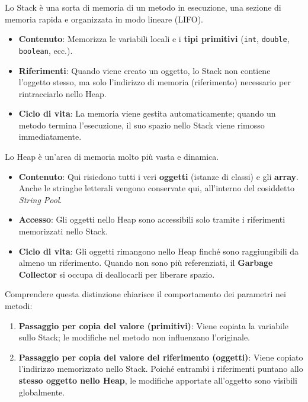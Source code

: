 Lo Stack è una sorta di memoria di un metodo in esecuzione, una sezione di memoria rapida e organizzata in modo lineare (LIFO). 
\begin{itemize}
    \item \textbf{Contenuto}: Memorizza le variabili locali e i \textbf{tipi primitivi} (\texttt{int}, \texttt{double}, \texttt{boolean}, ecc.).
    \item \textbf{Riferimenti}: Quando viene creato un oggetto, lo Stack non contiene l'oggetto stesso, ma solo l'indirizzo di memoria (riferimento) necessario per rintracciarlo nello Heap.
    \item \textbf{Ciclo di vita}: La memoria viene gestita automaticamente; quando un metodo termina l'esecuzione, il suo spazio nello Stack viene rimosso immediatamente.
\end{itemize}
\vspace{\baselineskip}
Lo Heap è un'area di memoria molto più vasta e dinamica.
\begin{itemize}
    \item \textbf{Contenuto}: Qui risiedono tutti i veri \textbf{oggetti} (istanze di classi) e gli \textbf{array}. Anche le stringhe letterali vengono conservate qui, all'interno del cosiddetto \textit{String Pool}.
    \item \textbf{Accesso}: Gli oggetti nello Heap sono accessibili solo tramite i riferimenti memorizzati nello Stack.
    \item \textbf{Ciclo di vita}: Gli oggetti rimangono nello Heap finché sono raggiungibili da almeno un riferimento. Quando non sono più referenziati, il \textbf{Garbage Collector} si occupa di deallocarli per liberare spazio.
\end{itemize}

\begin{observation}
Comprendere questa distinzione chiarisce il comportamento dei parametri nei metodi:
\begin{enumerate}
    \item \textbf{Passaggio per copia del valore (primitivi)}: Viene copiata la variabile sullo Stack; le modifiche nel metodo non influenzano l'originale.
    \item \textbf{Passaggio per copia del valore del riferimento (oggetti)}: Viene copiato l'indirizzo memorizzato nello Stack. Poiché entrambi i riferimenti puntano allo \textbf{stesso oggetto nello Heap}, le modifiche apportate all'oggetto sono visibili globalmente.
\end{enumerate}
\end{observation}


